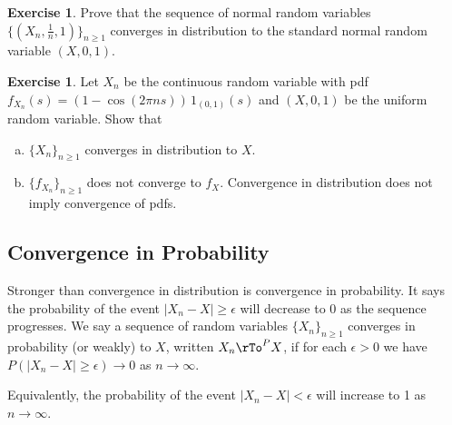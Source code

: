 \documentclass[12pt]{amsart}
\theoremstyle{definition}
\newtheorem{exercise}[theorem]{Exercise}
\begin{document}
\begin{exercise} \label{convergence_in_distribution_5} Prove that the sequence of normal random variables $\{(X_n, \frac{1}{n}, 1)\}_{n \geq 1}$ converges in distribution to the standard normal random variable $(X, 0, 1)$.
\end{exercise}

\begin{exercise} \label{convergence_in_distribution_6} Let $X_n$ be the continuous random variable with pdf $f_{X_n}(s) = (1 - \cos(2\pi n s)) \, 1_{(0,1)}(s)$ and $(X,0,1)$ be the uniform random variable. Show that
\begin{enumerate}[a.]
\item $\{X_n\}_{n \geq 1}$ converges in distribution to $X$.
\item $\{f_{X_n}\}_{n \geq 1}$ does not converge to $f_X$. Convergence in distribution does not imply convergence of pdfs.
\end{enumerate}
\end{exercise}

\subsection{Convergence in Probability} Stronger than convergence in distribution is convergence in probability. It says the probability of the event $|X_n - X| \geq \epsilon$ will decrease to 0 as the sequence progresses.
\dfn We say a sequence of random variables $\{X_n\}_{n \geq 1}$ converges in probability (or weakly) to $X$, written $X_n \rTo^{P} X$, if for each $\epsilon > 0$ we have $P(|X_n - X| \geq \epsilon) \rightarrow 0$ as $n \rightarrow \infty$.

Equivalently, the probability of the event $|X_n - X| < \epsilon$ will increase to 1 as $n \to \infty$.
\end{document}
